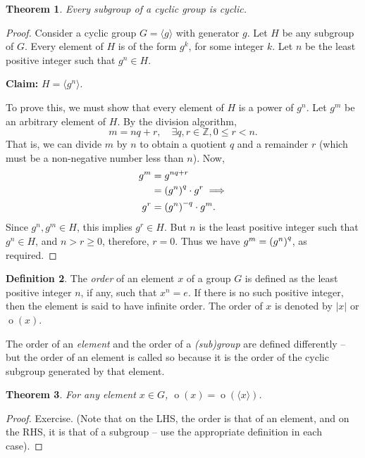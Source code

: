 \documentclass[svgnames]{article}
\newtheorem{Theorem}{Theorem}[section]
\theoremstyle{definition}
\newtheorem{Definition}[Theorem]{Definition}
\theoremstyle{remark}
\DeclareMathOperator{\ord}{o}
\begin{document}
\begin{Theorem}
Every subgroup of a cyclic group is cyclic.
\end{Theorem}
\begin{proof}
Consider a cyclic group $G = \langle g \rangle$ with generator $g$. Let $H$ be any subgroup of $G$. Every element of $H$ is of the form $g^k$, for some integer $k$. Let $n$ be the least positive integer such that $g^n \in H$.

\textbf{Claim:} $H = \langle g^n \rangle$.

To prove this, we must show that every element of $H$ is a power of $g^n$. Let $g^m$ be an arbitrary element of $H$. By the division algorithm,
\begin{equation*}
m = nq + r, \quad \exists q, r \in \mathbb Z, 0 \le r < n.
\end{equation*}
That is, we can divide $m$ by $n$ to obtain a quotient $q$ and a remainder $r$ (which must be a non-negative number less than $n$). Now,
\begin{align*}
g^m & = g^{nq + r} \\
	& = \pqty{g^n}^q \cdot g^r \implies \\
g^r & = \pqty{g^n}^{-q} \cdot g^m.
\end{align*}
Since $g^n, g^m \in H$, this implies $g^r \in H$. But $n$ is the least positive integer such that $g^n \in H$, and $n > r \ge 0$, therefore, $r = 0$. Thus we have $g^m = \pqty{g^n}^q$, as required.
\end{proof}

\begin{Definition}\label{def:OrdElem}
The \emph{order} of an element $x$ of a group $G$ is defined as the least positive integer $n$, if any, such that $x^n = e$. If there is no such positive integer, then the element is said to have infinite order. The order of $x$ is denoted by $|x|$ or $\ord(x)$.
\end{Definition}

The order of an \emph{element} and the order of a \emph{(sub)group} are defined differently -- but the order of an element is called so because it is the order of the cyclic subgroup generated by that element.

\begin{Theorem}
For any element $x \in G$, $\ord(x) = \ord(\langle x \rangle)$.
\end{Theorem}
\begin{proof}
Exercise. (Note that on the LHS, the order is that of an element, and on the RHS, it is that of a subgroup -- use the appropriate definition in each case).
\end{proof}
\end{document}
